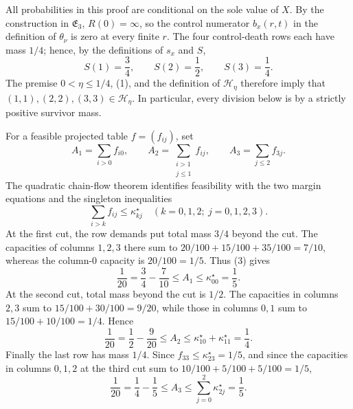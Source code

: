 All probabilities in this proof are conditional on the sole value of \(X\).  By the construction in \(\mathfrak E_3\), \(R(0)=\infty\), so the control numerator \(b_x(r,t)\) in the definition of \(\theta_\nu\) is zero at every finite \(r\).  The four control-death rows each have mass \(1/4\); hence, by the definitions of \(s_x\) and \(S\),
\[
 S(1)=\frac34,\qquad S(2)=\frac12,\qquad S(3)=\frac14. \tag{1}
\]
The premise \(0<\eta\leq 1/4\), (1), and the definition of \(\mathcal H_\eta\) therefore imply that \((1,1),(2,2),(3,3)\in\mathcal H_\eta\).  In particular, every division below is by a strictly positive survivor mass.

For a feasible projected table \(f=(f_{ij})\), set
\[
 A_1=\sum_{i>0}f_{i0},\qquad
 A_2=\sum_{\substack{i>1\\ j\leq1}}f_{ij},\qquad
 A_3=\sum_{j\leq2}f_{3j}. \tag{2}
\]
The quadratic chain-flow theorem identifies feasibility with the two margin equations and the singleton inequalities
\[
 \sum_{i>k}f_{ij}\leq\kappa^\star_{kj}\quad(k=0,1,2;\ j=0,1,2,3). \tag{3}
\]
At the first cut, the row demands put total mass \(3/4\) beyond the cut.  The capacities of columns \(1,2,3\) there sum to \(20/100+15/100+35/100=7/10\), whereas the column-\(0\) capacity is \(20/100=1/5\).  Thus (3) gives
\[
 \frac1{20}=\frac34-\frac7{10}\leq A_1\leq\kappa^\star_{00}=\frac15. \tag{4}
\]
At the second cut, total mass beyond the cut is \(1/2\).  The capacities in columns \(2,3\) sum to \(15/100+30/100=9/20\), while those in columns \(0,1\) sum to \(15/100+10/100=1/4\).  Hence
\[
 \frac1{20}=\frac12-\frac9{20}\leq A_2
 \leq\kappa^\star_{10}+\kappa^\star_{11}=\frac14. \tag{5}
\]
Finally the last row has mass \(1/4\).  Since \(f_{33}\leq\kappa^\star_{23}=1/5\), and since the capacities in columns \(0,1,2\) at the third cut sum to \(10/100+5/100+5/100=1/5\),
\[
 \frac1{20}=\frac14-\frac15\leq A_3
 \leq\sum_{j=0}^2\kappa^\star_{2j}=\frac15. \tag{6}
\]

